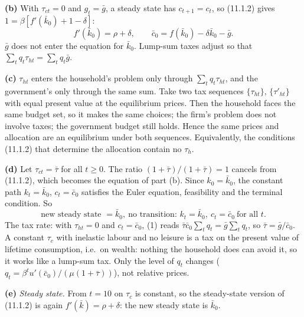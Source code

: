\documentclass[12pt, letterpaper]{article}
\newcommand{\kb}{\bar k}
\newcommand{\cb}{\bar c}
\newcommand{\gb}{\bar g}
\begin{document}
\begin{tcolorbox}[oddbox,title={Exercise 11.1 \quad Tax reform: I}]
\textbf{(b)} With $\tau_{ct}=0$ and $g_t=\gb$, a steady state has $c_{t+1}=c_t$, so (11.1.2) gives
$1=\beta[f'(\kb_0)+1-\delta]$:
\[
f'(\kb_0)=\rho+\delta,\qquad \cb_0=f(\kb_0)-\delta\kb_0-\gb .
\]
$\gb$ does not enter the equation for $\kb_0$. Lump-sum taxes adjust so that $\sum_tq_t\tau_{ht}=\sum_tq_t\gb$.

\textbf{(c)} $\tau_{ht}$ enters the household's problem only through $\sum_tq_t\tau_{ht}$, and the government's only through
the same sum. Take two tax sequences $\{\tau_{ht}\}$, $\{\tau'_{ht}\}$ with equal present value at the equilibrium prices.
Then the household faces the same budget set, so it makes the same choices; the firm's problem does not involve taxes;
the government budget still holds. Hence the same prices and allocation are an equilibrium under both sequences.
Equivalently, the conditions (11.1.2) that determine the allocation contain no $\tau_h$.

\textbf{(d)} Let $\tau_{ct}=\bar\tau$ for all $t\ge0$. The ratio $(1+\bar\tau)/(1+\bar\tau)=1$ cancels from (11.1.2), which
becomes the equation of part (b). Since $k_0=\kb_0$, the constant path $k_t=\kb_0$, $c_t=\cb_0$ satisfies the Euler
equation, feasibility and the terminal condition. So
\[
\boxed{\text{new steady state }=\kb_0,\ \text{no transition: }k_t=\kb_0,\ c_t=\cb_0\ \text{for all }t.}
\]
The tax rate: with $\tau_{ht}=0$ and $c_t=\cb_0$, (1) reads $\bar\tau\cb_0\sum_tq_t=\gb\sum_tq_t$, so
$\bar\tau=\gb/\cb_0$. A constant $\tau_c$ with inelastic labour and no leisure is a tax on the present value of lifetime
consumption, i.e.\ on wealth: nothing the household does can avoid it, so it works like a lump-sum tax. Only the level
of $q_t$ changes ($q_t=\beta^tu'(\cb_0)/(\mu(1+\bar\tau))$), not relative prices.

\textbf{(e)} \emph{Steady state.} From $t=10$ on $\tau_c$ is constant, so the steady-state version of (11.1.2) is again
$f'(\kb)=\rho+\delta$: the new steady state is $\kb_0$.


\end{tcolorbox}
\end{document}

